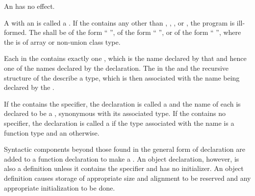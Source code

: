 \pnum
An  has no effect.

\pnum
A  with an  is called
a .
If the  contains
any  other than
, , , or
,
the program is ill-formed.
The  shall be
of the form ``\tcode{=} '',
of the form ``\tcode{\{}  \tcode{\}}'',
or
of the form ``\tcode{(}  \tcode{)}'',
where the
 is of array or non-union class type.

\pnum
Each  in the 
contains exactly one , which is the name
declared by that  and hence one of the names
declared by the declaration. The
 in the
 and the recursive 
structure of the  describe a
type, which is then associated with the name being
declared by the .

\pnum
If the  contains the 
specifier, the declaration is called a  and the name
of each 
is declared to be a , synonymous with its
associated type. If the
 contains no  specifier, the
declaration is called a  if
the type associated with the name is a function type and
an  otherwise.

\pnum
{}%
Syntactic components beyond those found in the general form of
declaration are added to a function declaration to make a
. An object declaration, however, is also
a definition unless it contains the  specifier and has no
initializer.
%
An object definition causes storage of appropriate size and alignment to be reserved and
any appropriate initialization to be done.

